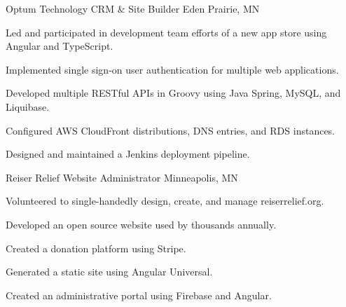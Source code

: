 \begin{cventries}
    \cventry
    {Optum Technology} %
    {CRM \& Site Builder} %
    {Eden Prairie, MN} %
    {} %
    {
    \begin{cvitems} %
        \item {Led and participated in development team efforts of a new app store using Angular and TypeScript.}
        \item {Implemented single sign-on user authentication for multiple web applications.}
        \item {Developed multiple RESTful APIs in Groovy using Java Spring, MySQL, and Liquibase.}
        \item {Configured AWS CloudFront distributions, DNS entries, and RDS instances.}
        \item {Designed and maintained a Jenkins deployment pipeline.}
    \end{cvitems}
    }

    \cventry
    {Reiser Relief} %
    {Website Administrator} %
    {Minneapolis, MN} %
    {} %
    {
    \begin{cvitems} %
        \item {Volunteered to single-handedly design, create, and manage reiserrelief.org.}
        \item {Developed an open source website used by thousands annually.}
        \item {Created a donation platform using Stripe.}
        \item {Generated a static site using Angular Universal.}
        \item {Created an administrative portal using Firebase and Angular.}
    \end{cvitems}
    }

\end{cventries}
